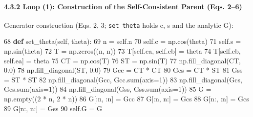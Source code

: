 \documentclass[
  a4paper,
]{ltjsarticle}
\newenvironment{Shaded}{}{}
\newcommand{\BuiltInTok}[1]{\textcolor[rgb]{0.00,0.50,0.00}{#1}}
\newcommand{\DecValTok}[1]{\textcolor[rgb]{0.25,0.63,0.44}{#1}}
\newcommand{\FloatTok}[1]{\textcolor[rgb]{0.25,0.63,0.44}{#1}}
\newcommand{\KeywordTok}[1]{\textcolor[rgb]{0.00,0.44,0.13}{\textbf{#1}}}
\newcommand{\NormalTok}[1]{#1}
\newcommand{\OperatorTok}[1]{\textcolor[rgb]{0.40,0.40,0.40}{#1}}
\newcommand{\VariableTok}[1]{\textcolor[rgb]{0.10,0.09,0.49}{#1}}
\begin{document}
\paragraph{4.3.2 Loop (1): Construction of the Self-Consistent Parent
(Eqs.
2--6)}\label{loop-1-construction-of-the-self-consistent-parent-eqs.-26}

Generator construction (Eqs. 2, 3; \texttt{set\_theta} holds c, s and
the analytic G):

\begin{Shaded}
\begin{Highlighting}[]
    \DecValTok{68}      \KeywordTok{def}\NormalTok{ set\_theta(}\VariableTok{self}\NormalTok{, theta):}
    \DecValTok{69}\NormalTok{          n }\OperatorTok{=} \VariableTok{self}\NormalTok{.n}
    \DecValTok{70}          \VariableTok{self}\NormalTok{.c }\OperatorTok{=}\NormalTok{ np.cos(theta)}
    \DecValTok{71}          \VariableTok{self}\NormalTok{.s }\OperatorTok{=}\NormalTok{ np.sin(theta)}
    \DecValTok{72}\NormalTok{          T }\OperatorTok{=}\NormalTok{ np.zeros((n, n))}
    \DecValTok{73}\NormalTok{          T[}\VariableTok{self}\NormalTok{.ea, }\VariableTok{self}\NormalTok{.eb] }\OperatorTok{=}\NormalTok{ theta}
    \DecValTok{74}\NormalTok{          T[}\VariableTok{self}\NormalTok{.eb, }\VariableTok{self}\NormalTok{.ea] }\OperatorTok{=}\NormalTok{ theta}
    \DecValTok{75}\NormalTok{          CT }\OperatorTok{=}\NormalTok{ np.cos(T)}
    \DecValTok{76}\NormalTok{          ST }\OperatorTok{=}\NormalTok{ np.sin(T)}
    \DecValTok{77}\NormalTok{          np.fill\_diagonal(CT, }\FloatTok{0.0}\NormalTok{)}
    \DecValTok{78}\NormalTok{          np.fill\_diagonal(ST, }\FloatTok{0.0}\NormalTok{)}
    \DecValTok{79}\NormalTok{          Gcc }\OperatorTok{=}\NormalTok{ CT }\OperatorTok{*}\NormalTok{ CT}
    \DecValTok{80}\NormalTok{          Gcs }\OperatorTok{=}\NormalTok{ CT }\OperatorTok{*}\NormalTok{ ST}
    \DecValTok{81}\NormalTok{          Gss }\OperatorTok{=}\NormalTok{ ST }\OperatorTok{*}\NormalTok{ ST}
    \DecValTok{82}\NormalTok{          np.fill\_diagonal(Gcc, Gcc.}\BuiltInTok{sum}\NormalTok{(axis}\OperatorTok{=}\DecValTok{1}\NormalTok{))}
    \DecValTok{83}\NormalTok{          np.fill\_diagonal(Gcs, Gcs.}\BuiltInTok{sum}\NormalTok{(axis}\OperatorTok{=}\DecValTok{1}\NormalTok{))}
    \DecValTok{84}\NormalTok{          np.fill\_diagonal(Gss, Gss.}\BuiltInTok{sum}\NormalTok{(axis}\OperatorTok{=}\DecValTok{1}\NormalTok{))}
    \DecValTok{85}\NormalTok{          G }\OperatorTok{=}\NormalTok{ np.empty((}\DecValTok{2} \OperatorTok{*}\NormalTok{ n, }\DecValTok{2} \OperatorTok{*}\NormalTok{ n))}
    \DecValTok{86}\NormalTok{          G[:n, :n] }\OperatorTok{=}\NormalTok{ Gcc}
    \DecValTok{87}\NormalTok{          G[:n, n:] }\OperatorTok{=}\NormalTok{ Gcs}
    \DecValTok{88}\NormalTok{          G[n:, :n] }\OperatorTok{=}\NormalTok{ Gcs}
    \DecValTok{89}\NormalTok{          G[n:, n:] }\OperatorTok{=}\NormalTok{ Gss}
    \DecValTok{90}          \VariableTok{self}\NormalTok{.G }\OperatorTok{=}\NormalTok{ G}
\end{Highlighting}
\end{Shaded}
\end{document}
